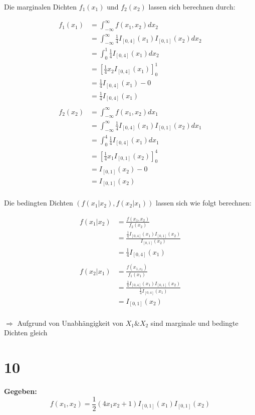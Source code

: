 \documentclass{article}
\begin{document}
Die marginalen Dichten $f_{1}(x_{1})$ und $f_{2}(x_{2})$ lassen sich berechnen durch:

\begin{align*}
    f_{1}(x_{1}) &= \int_{-\infty}^{\infty}f(x_{1}, x_{2}) dx_{2} \\
    &= \int_{-\infty}^{\infty}\frac{1}{4}I_{[0,4]}(x_{1})I_{[0,1]}(x_{2})dx_{2} \\
    &= \int_{0}^{1}\frac{1}{4}I_{[0,4]}(x_{1})dx_{2} \\
    &= [\frac{1}{4}x_{2}I_{[0,4]}(x_{1})]_{0}^{1} \\
    &= \frac{1}{4}I_{[0,4]}(x_{1}) - 0 \\
    &= \frac{1}{4}I_{[0,4]}(x_{1}) \\ \\
    f_{2}(x_{2}) &= \int_{-\infty}^{\infty}f(x_{1}, x_{2}) dx_{1} \\
    &= \int_{-\infty}^{\infty}\frac{1}{4}I_{[0,4]}(x_{1})I_{[0,1]}(x_{2})dx_{1} \\
    &= \int_{0}^{4}\frac{1}{4}I_{[0,4]}(x_{1})dx_{1} \\
    &= [\frac{1}{4}x_{1}I_{[0,1]}(x_{2})]_{0}^{4} \\
    &= I_{[0,1]}(x_{2}) - 0 \\
    &= I_{[0,1]}(x_{2})
\end{align*} \\ 

Die bedingten Dichten $(f(x_{1}|x_{2}), f(x_{2}|x_{1}))$ lassen sich wie folgt berechnen:

\begin{align*}
    f(x_{1}|x_{2}) &= \frac{f(x_{1}, x_{2})}{f_{2}(x_{2})} \\
    &= \frac{\frac{1}{4}I_{[0,4]}(x_{1})I_{[0,1]}(x_{2})}{I_{[0,1]}(x_{2})} \\
    &= \frac{1}{4}I_{[0,4]}(x_{1}) \\ \\
    f(x_{2}|x_{1}) &= \frac{f(x_{1, x_{2}})}{f_{1}(x_{1})} \\
    &= \frac{\frac{1}{4}I_{[0,4]}(x_{1})I_{[0,1]}(x_{2})}{\frac{1}{4}I_{[0,4]}(x_{1})} \\
    &= I_{[0,1]}(x_{2})
\end{align*}\\

$\Longrightarrow$ Aufgrund von Unabhängigkeit von $X_{1} \& X_{2}$ sind marginale und bedingte Dichten gleich

\section*{10}
\textbf{Gegeben:}
\[f(x_{1}, x_{2}) = \frac{1}{2}(4x_{1}x_{2}+ 1)I_{[0,1]}(x_{1})I_{[0,1]}(x_{2})\]
\end{document}
